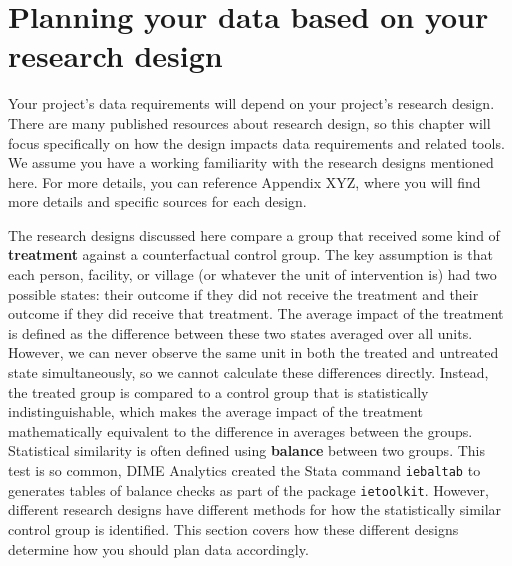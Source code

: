 


\section{Planning your data based on your research design}

Your project's data requirements will depend on your project's research design.
There are many published resources about research design,
so this chapter will focus specifically on how the design impacts data requirements
and related tools.
We assume you have a working familiarity
with the research designs mentioned here.
For more details, you can reference Appendix XYZ,
where you will find more details and specific sources for each design.

The research designs discussed here compare a group that received
some kind of \textbf{treatment}
against a counterfactual control group.
The key assumption is that each
person, facility, or village (or whatever the unit of intervention is)
had two possible states: their outcome if they did not receive the treatment
and their outcome if they did receive that treatment.
The average impact of the treatment is defined as
the difference between these two states averaged over all units.
However, we can never observe the same unit
in both the treated and untreated state simultaneously,
so we cannot calculate these differences directly.
Instead, the treated group is compared to a control group
that is statistically indistinguishable,
which makes the average impact of the treatment
mathematically equivalent to the difference in averages between the groups.
Statistical similarity is often defined using \textbf{balance} between two groups.
This test is so common,
DIME Analytics created the Stata command \texttt{iebaltab}
to generates tables of balance checks
as part of the package \texttt{ietoolkit}.
However, different research designs have different methods
for how the statistically similar control group is identified.
This section covers how these different designs
determine how you should plan data accordingly.

